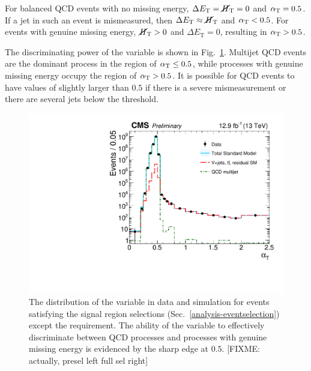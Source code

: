 For balanced QCD events with no missing energy, $\Delta E_\mathrm T = \mbox{$\cancel{H}_\text{T}$} = 0$ 
and $\alpha_{\text{T}} = 0.5$. If a jet in such an event is mismeasured, then $\Delta 
E_\mathrm T \approx \mbox{$\cancel{H}_\text{T}$}$ and $\alpha_{\text{T}} < 0.5$. For events with genuine missing 
energy, $\mbox{$\cancel{H}_\text{T}$} > 0$ and $\Delta E_\mathrm T = 0$, resulting in $\alpha_{\text{T}} > 0.5$.

The discriminating power of the \alphat variable is shown in 
Fig.~\ref{fig:alphat}. Multijet QCD events are the dominant process in the 
region of $\alpha_{\text{T}} \leq 0.5$, while processes with genuine missing energy 
occupy the region of $\alpha_{\text{T}} > 0.5$. It is possible for QCD events to have 
values of \alphat slightly larger than $0.5$ if there is a severe 
mismeasurement or there are several jets below the \pt threshold.




\begin{figure}[t!]
\begin{center}
\includegraphics[width=0.7\linewidth]{figs/analysis/propaganda_alphat}
\caption{The distribution of the \alphat variable in data and simulation for 
events satisfying the signal region selections 
(Sec.~\ref{analysis-eventselection}) except the \alphat requirement. The 
ability of the variable to effectively discriminate between QCD processes and 
processes with genuine missing energy is evidenced by the sharp edge at $0.5$. 
[FIXME: actually, presel left full sel right]}
\label{fig:alphat}
\end{center}
\end{figure}


